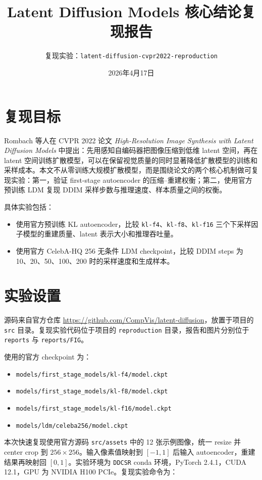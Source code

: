 \documentclass[11pt,a4paper]{article}
\title{Latent Diffusion Models 核心结论复现报告}
\author{复现实验：\texttt{latent-diffusion-cvpr2022-reproduction}}
\date{2026年4月17日}
\begin{document}
\maketitle

\section{复现目标}

Rombach 等人在 CVPR 2022 论文 \emph{High-Resolution Image Synthesis with Latent Diffusion Models} 中提出：先用感知自编码器把图像压缩到低维 latent 空间，再在 latent 空间训练扩散模型，可以在保留视觉质量的同时显著降低扩散模型的训练和采样成本。本文不从零训练大规模扩散模型，而是围绕论文的两个核心机制做可复现实验：第一，验证 first-stage autoencoder 的压缩--重建权衡；第二，使用官方预训练 LDM 复现 DDIM 采样步数与推理速度、样本质量之间的权衡。

具体实验包括：
\begin{itemize}
  \item 使用官方预训练 KL autoencoder，比较 \texttt{kl-f4}、\texttt{kl-f8}、\texttt{kl-f16} 三个下采样因子模型的重建质量、latent 表示大小和推理吞吐量。
  \item 使用官方 CelebA-HQ 256 无条件 LDM checkpoint，比较 DDIM steps 为 10、20、50、100、200 时的采样速度和生成样本。
\end{itemize}

\section{实验设置}

源码来自官方仓库 \url{https://github.com/CompVis/latent-diffusion}，放置于项目的 \texttt{src} 目录。复现实验代码位于项目的 \texttt{reproduction} 目录，报告和图片分别位于 \texttt{reports} 与 \texttt{reports/FIG}。

使用的官方 checkpoint 为：
\begin{itemize}
  \item \texttt{models/first\_stage\_models/kl-f4/model.ckpt}
  \item \texttt{models/first\_stage\_models/kl-f8/model.ckpt}
  \item \texttt{models/first\_stage\_models/kl-f16/model.ckpt}
  \item \texttt{models/ldm/celeba256/model.ckpt}
\end{itemize}

本次快速复现使用官方源码 \texttt{src/assets} 中的 12 张示例图像，统一 resize 并 center crop 到 $256\times256$。输入像素值映射到 $[-1,1]$ 后输入 autoencoder，重建结果再映射回 $[0,1]$。实验环境为 \texttt{DDCSR} conda 环境，PyTorch 2.4.1，CUDA 12.1，GPU 为 NVIDIA H100 PCIe。复现实验命令为：
\end{document}
